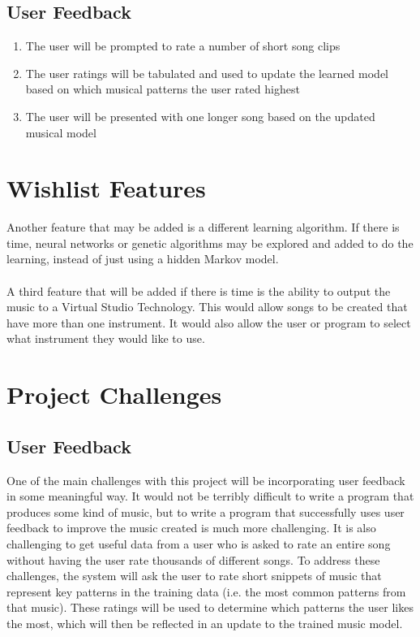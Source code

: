 \documentclass{article}
\begin{document}
\subsection{User Feedback}
\begin{enumerate}
\item The user will be prompted to rate a number of short song clips
\item The user ratings will be tabulated and used to update the learned model based on which musical patterns the user rated highest
\item The user will be presented with one longer song based on the updated musical model
\end{enumerate}

\section{Wishlist Features}
Another feature that may be added is a different learning algorithm. If there is time, neural networks or genetic algorithms may be explored and added to do the learning, instead of just using a hidden Markov model.\\
\\
A third feature that will be added if there is time is the ability to output the music to a Virtual Studio Technology. This would allow songs to be created that have more than one instrument. It would also allow the user or program to select what instrument they would like to use.

\section{Project Challenges}
\subsection{User Feedback}
One of the main challenges with this project will be incorporating user feedback in some meaningful way. It would not be terribly difficult to write a program that produces some kind of music, but to write a program that successfully uses user feedback to improve the music created is much more challenging. It is also challenging to get useful data from a user who is asked to rate an entire song without having the user rate thousands of different songs. To address these challenges, the system will ask the user to rate short snippets of music that represent key patterns in the training data (i.e. the most common patterns from that music). These ratings will be used to determine which patterns the user likes the most, which will then be reflected in an update to the trained music model.
\end{document}
